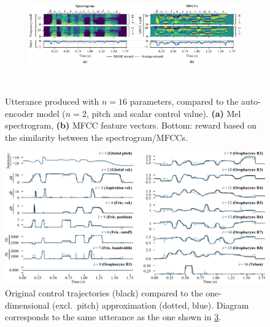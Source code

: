 \documentclass[letterpaper,10pt,conference]{ieeeconf}
\begin{document}
\begin{figure}[p]
	\begin{subfigure}[t]{\textwidth}
		\centering
		\includegraphics[scale=0.825]{media/control_network_spectrogram.pdf}
		\label{fig:control_network_spectrogram}
	\end{subfigure}
	\begin{subfigure}[t]{0\textwidth}
		~
		\label{fig:control_network_mfccs}
	\end{subfigure}
	\caption{Utterance produced with $n = 16$ parameters, compared to the auto-encoder model ($n = 2$, pitch and scalar control value). \textbf{(a)} Mel spectrogram, \textbf{(b)} MFCC feature vectors. Bottom: reward based on the similarity between the spectrogram/MFCCs.}
	\label{fig:control_network_one_dim}
\end{figure}

\begin{figure}[p]
	\centering
	\includegraphics[scale=0.825]{media/trm_params.pdf}
	\caption{Original control trajectories (black) compared to the one-dimensional (excl.~pitch) approximation (dotted, blue). Diagram corresponds to the same utterance as the one shown in \cref{fig:control_network_one_dim}.}
	\label{fig:control_parameters}
\end{figure}
\end{document}
